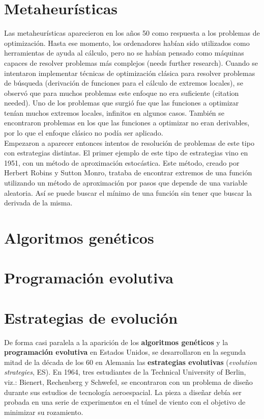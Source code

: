 \documentclass[12pt]{article} \usepackage[utf8x]{inputenc}
\begin{document}
\section{Metaheurísticas}

Las metaheurísticas aparecieron en los años 50 como respuesta a los
problemas de optimización. Hasta ese momento, los ordenadores habían
sido utilizados como herramientas de ayuda al cálculo, pero no se
habían pensado como máquinas capaces de resolver problemas más
complejos (needs further research). Cuando se intentaron implementar
técnicas de optimización clásica para resolver problemas de búsqueda
(derivación de funciones para el cálculo de extremos locales), se
observó que para muchos problemas este enfoque no era suficiente
(citation needed). Uno de los problemas que surgió fue que las
funciones a optimizar tenían muchos extremos locales, infinitos en
algunos casos. También se encontraron problemas en los que las
funciones a optimizar no eran derivables, por lo que el enfoque
clásico no podía
ser aplicado.\\

Empezaron a aparecer entonces intentos de resolución de problemas de
este tipo con estrategias distintas. El primer ejemplo de este tipo de
estrategias vino en 1951, con un método de aproximación estocástica.
Este método, creado por Herbert Robins y Sutton Monro, trataba de
encontrar extremos de una función utilizando un método de aproximación
por pasos que depende de una variable aleatoria. Así se puede buscar
el mínimo de una función sin tener que buscar la derivada de la misma.\\

\section{Algoritmos genéticos}

\section{Programación evolutiva}

\section{Estrategias de evolución}

De forma casi paralela a la aparición de los \textbf{algoritmos
 genéticos} y la \textbf{programación evolutiva} en Estados Unidos,
se desarrollaron en la segunda mitad de la década de los 60 en
Alemania las \textbf{estrategias evolutivas} (\textit{evolution
  strategies}, ES). En 1964, tres estudiantes de la Technical University of
Berlin, viz.: Bienert, Rechenberg y Schwefel, se encontraron con un
problema de diseño durante sus estudios de tecnología aeroespacial. La
pieza a diseñar debía ser probada en una serie de experimentos en el
túnel de viento con el objetivo de minimizar su rozamiento. \\
\end{document}
